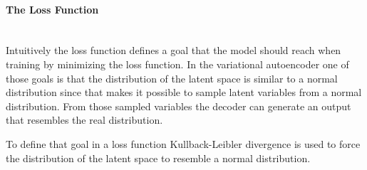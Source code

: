 \paragraph{The Loss Function}\mbox{}\\

Intuitively the loss function defines a goal that the model should reach when training by minimizing
the loss function. In the variational autoencoder one of those goals is that the distribution of the 
latent space is similar to a normal distribution since that makes it possible to sample latent 
variables from a normal distribution. From those sampled variables the decoder can generate an output
that resembles the real distribution.

To define that goal in a loss function Kullback-Leibler divergence is used to force the distribution
of the latent space to resemble a normal distribution.
